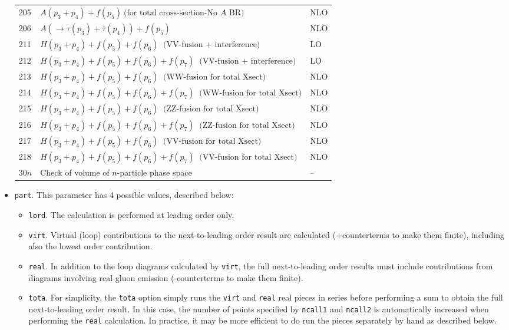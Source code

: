 \documentclass[12pt]{article}
\begin{document}
\begin{itemize}
\begin{table}
\begin{center}
\begin{tabular}{|l|l|l|}
205 &$  A(p_3+p_4) + f(p_5) ~\mbox{(for total cross-section-No $A$ BR)}$&   NLO \\
206 &$  A (\to \tau(p_3) + {\bar \tau}(p_4)) + f(p_5)$&   NLO \\
211 &$  H(p_3+p_4)+f(p_5)+f(p_6) ~\mbox{ (VV-fusion + interference)}$& LO \\
212 &$  H(p_3+p_4)+f(p_5)+f(p_6)+f(p_7) ~\mbox{ (VV-fusion + interference)}$& LO \\
213 &$  H(p_3+p_4)+f(p_5)+f(p_6) ~\mbox{ (WW-fusion for total Xsect)}$& NLO \\
214 &$  H(p_3+p_4)+f(p_5)+f(p_6)+f(p_7) ~\mbox{ (WW-fusion for total Xsect)}$& NLO \\
215 &$  H(p_3+p_4)+f(p_5)+f(p_6) ~\mbox{ (ZZ-fusion for total Xsect)}$& NLO \\   
216 &$  H(p_3+p_4)+f(p_5)+f(p_6)+f(p_7) ~\mbox{ (ZZ-fusion for total Xsect)}$& NLO \\
217 &$  H(p_3+p_4)+f(p_5)+f(p_6) ~\mbox{ (VV-fusion for total Xsect)}$& NLO \\
218 &$  H(p_3+p_4)+f(p_5)+f(p_6)+f(p_7) ~\mbox{ (VV-fusion for total Xsect)}$& NLO \\
\hline
30$n$ &  Check of volume of $n$-particle phase space& --  \\
\hline
\end{tabular}
\end{center}
\end{table}


\item {\tt part}.
This parameter has 4 possible values, described below:
\begin{itemize}
\item {\tt lord}.
The calculation is performed at leading order only.
\item {\tt virt}.
Virtual (loop) contributions to the next-to-leading order result are
calculated (+counterterms to make them finite), including also the
lowest order contribution.
\item {\tt real}.
In addition to the loop diagrams calculated by {\tt virt}, the full
next-to-leading order results must include contributions from diagrams
involving real gluon emission (-counterterms to make them finite).
\item {\tt tota}.
For simplicity, the {\tt tota} option simply runs the {\tt virt} and
{\tt real} real pieces in series before performing a sum to obtain
the full next-to-leading order result. In this case, the number of
points specified by {\tt ncall1} and {\tt ncall2} is automatically
increased when performing the {\tt real} calculation. In practice,
it may be more efficient to do run the pieces separately by hand as
described below.
\end{itemize}


\end{itemize}
\end{document}
